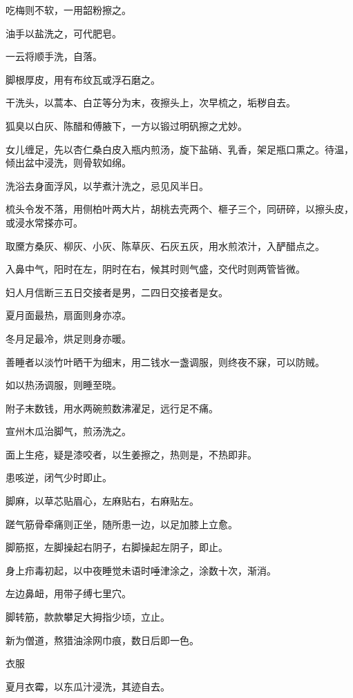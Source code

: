 \documentclass[a4paper,12pt,UTF8,twoside]{ctexbook}
\begin{document}
    吃梅则不软，一用韶粉擦之。
    
    油手以盐洗之，可代肥皂。
    
    一云将顺手洗，自落。
    
    脚根厚皮，用有布纹瓦或浮石磨之。
    
    干洗头，以蒿本、白芷等分为末，夜擦头上，次早梳之，垢秽自去。
    
    狐臭以白灰、陈醋和傅腋下，一方以锻过明矾擦之尤妙。
    
    女儿缠足，先以杏仁桑白皮入瓶内煎汤，旋下盐硝、乳香，架足瓶口熏之。待温，倾出盆中浸洗，则骨软如绵。
    
    洗浴去身面浮风，以芋煮汁洗之，忌见风半日。
    
    梳头令发不落，用侧柏叶两大片，胡桃去壳两个、榧子三个，同研碎，以擦头皮，或浸水常搽亦可。
    
    取黡方桑灰、柳灰、小灰、陈草灰、石灰五灰，用水煎浓汁，入酽醋点之。
    
    入鼻中气，阳时在左，阴时在右，候其时则气盛，交代时则两管皆微。
    
    妇人月信断三五日交接者是男，二四日交接者是女。
    
    夏月面最热，扇面则身亦凉。
    
    冬月足最冷，烘足则身亦暖。
    
    善睡者以淡竹叶晒干为细末，用二钱水一盏调服，则终夜不寐，可以防贼。
    
    如以热汤调服，则睡至晓。
    
    附子末数钱，用水两碗煎数沸濯足，远行足不痛。
    
    宣州木瓜治脚气，煎汤洗之。
    
    面上生疮，疑是漆咬者，以生姜擦之，热则是，不热即非。
    
    患咳逆，闭气少时即止。
    
    脚麻，以草芯贴眉心，左麻贴右，右麻贴左。
    
    蹉气筋骨牵痛则正坐，随所患一边，以足加膝上立愈。
    
    脚筋抠，左脚操起右阴子，右脚操起左阴子，即止。
    
    身上疖毒初起，以中夜睡觉未语时唾津涂之，涂数十次，渐消。
    
    左边鼻衄，用带子缚七里穴。
    
    脚转筋，款款攀足大拇指少顷，立止。
    
    新为僧道，熬猎油涂网巾痕，数日后即一色。
    
    衣服
    
    夏月衣霉，以东瓜汁浸洗，其迹自去。
    
\end{document}
